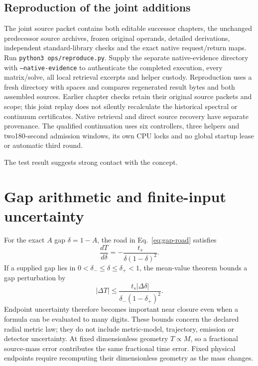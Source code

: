 \documentclass[10pt,twocolumn,letterpaper]{article}
\begin{document}
\subsection{Reproduction of the joint additions}
The joint source packet contains both editable successor chapters, the
unchanged predecessor source archives, frozen original operands, detailed
derivations, independent standard-library checks and the exact native
request/return maps. Run \texttt{python3 ops/reproduce.py}. Supply the separate
native-evidence directory with \texttt{--native-evidence} to authenticate
the completed execution, every matrix/solve, all local retrieval excerpts
and helper custody. Reproduction uses a fresh directory with spaces and
compares regenerated result bytes and both assembled sources.
Earlier chapter checks retain their original source packets and scope;
this joint replay does not silently recalculate the historical spectral
or continuum certificates. Native retrieval and direct source recovery
have separate provenance. The qualified continuation uses six controllers,
three helpers and two180-second admission windows, its own CPU locks and
no global startup lease or automatic third round.

The test result suggests strong contact with the concept.

\appendix
\section{Gap arithmetic and finite-input uncertainty}
For the exact $A$ gap $\delta=1-A$, the road in
Eq.~\eqref{eq:gap-road} satisfies
\begin{equation}
 \frac{dT}{d\delta}=-\frac{t_s}{\delta(1-\delta)^2}.
\end{equation}
If a supplied gap lies in $0<\delta_-\leq\delta\leq\delta_+<1$,
the mean-value theorem bounds a gap perturbation by
\begin{equation}
 |\Delta T|\leq
 \frac{t_s|\Delta\delta|}{\delta_-(1-\delta_+)^2}.
\end{equation}
Endpoint uncertainty therefore becomes important near closure even
when a formula can be evaluated to many digits. These bounds concern
the declared radial metric law; they do not include metric-model,
trajectory, emission or detector uncertainty. At fixed dimensionless
geometry $T\propto M$, so a fractional source-mass error contributes
the same fractional time error. Fixed physical endpoints require
recomputing their dimensionless geometry as the mass changes.
\end{document}
